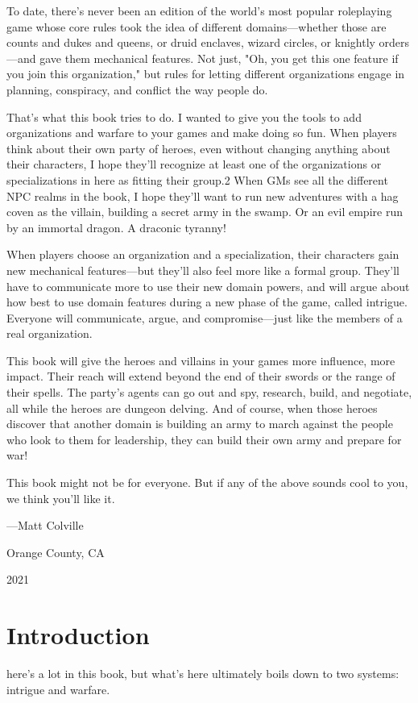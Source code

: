 \documentclass[10pt,a4paper,twoside,bg=print,twocolumn,openany,nodeprecatedcode]{dndbook}
\begin{document}
To date, there's never been an edition of the world's most popular roleplaying game whose core rules took the idea of different domains—whether those are counts and dukes and queens, or druid enclaves, wizard circles, or knightly orders—and gave them mechanical features. Not just, "Oh, you get this one feature if you join this organization," but rules for letting different organizations engage in planning, conspiracy, and conflict the way people do.

That's what this book tries to do. I wanted to give you the tools to add organizations and warfare to your games and make doing so fun. When players think about their own party of heroes, even without changing anything about their characters, I hope they'll recognize at least one of the organizations or specializations in here as fitting their group.2 When GMs see all the different NPC realms in the book, I hope they'll want to run new adventures with a hag coven as the villain, building a secret army in the swamp. Or an evil empire run by an immortal dragon. A draconic tyranny!

When players choose an organization and a specialization, their characters gain new mechanical features—but they'll also feel more like a formal group. They'll have to communicate more to use their new domain powers, and will argue about how best to use domain features during a new phase of the game, called intrigue. Everyone will communicate, argue, and compromise—just like the members of a real organization.

This book will give the heroes and villains in your games more influence, more impact. Their reach will extend beyond the end of their swords or the range of their spells. The party's agents can go out and spy, research, build, and negotiate, all while the heroes are dungeon delving. And of course, when those heroes discover that another domain is building an army to march against the people who look to them for leadership, they can build their own army and prepare for war!

This book might not be for everyone. But if any of the above sounds cool to you, we think you'll like it.

—Matt Colville

Orange County, CA

2021

\chapter*{Introduction}
here's a lot in this book, but what's here ultimately boils down to two systems: intrigue and warfare.
\end{document}

